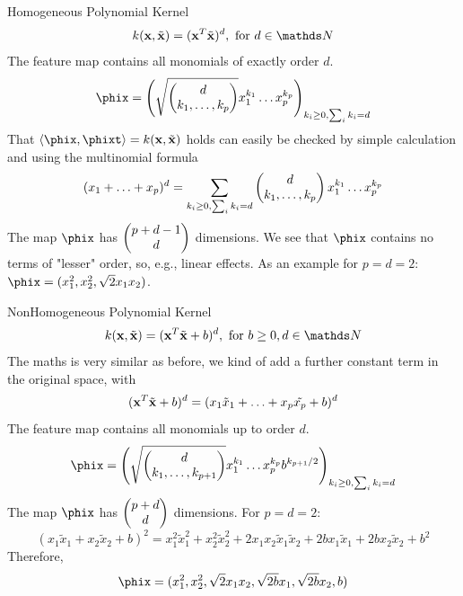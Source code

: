 \documentclass[11pt,compress,t,notes=noshow, xcolor=table]{beamer}
\begin{document}

\begin{vbframe}{Homogeneous Polynomial Kernel}
$$ k(\xv, \xtil) = (\xv^T \xtil)^d, \text{ for } d \in \N$$
The feature map contains all monomials of exactly order $d$.
  $$\phix = \left( \sqrt{\mat{d \\ k_1, \ldots, k_p}} x_1^{k_1} \ldots x_p^{k_p}\right)_{k_i \geq 0, \sum_i k_i = d}$$
That $\scp{\phix}{\phixt} = k(\xv, \xtil)$ holds can easily be checked by simple calculation
and using the multinomial formula
$$ (x_1 + \ldots + x_p)^d = \sum_{k_i \geq 0, \sum_i k_i = d} \begin{pmatrix} d \\ k_1, \ldots, k_p \end{pmatrix} x_1^{k_1} \ldots x_p^{k_p}$$
The map $\phix$ has $\begin{pmatrix} p + d - 1 \\ d \end{pmatrix}$ dimensions.
We see that $\phix$ contains no terms of "lesser" order, so, e.g., linear effects.
As an example for $p=d=2$: $\phix = (x_1^2, x_2^2, \sqrt{2} x_1 x_2)$.
\end{vbframe}

\begin{vbframe}{NonHomogeneous Polynomial Kernel}
\small
 $$k(\xv, \xtil) = (\xv^T \xtil + b)^d, \text{ for } b\geq 0, d \in \N$$
The maths is very similar as before, we kind of add a further constant term in the original space, with
$$ (\mathbf{x}^T \tilde{\mathbf{x}} + b)^d = (x_1 \tilde{x}_1 + \ldots + x_p \tilde{x_p} + b)^d$$
The feature map contains all monomials up to order $d$.
  $$\phix = \left( \sqrt{\mat{d \\ k_1, \ldots, k_{p+1}}} x_1^{k_1} \ldots x_p^{k_p} b^{k_{p+1}/2} \right)_{k_i \geq 0, \sum_i k_i = d}$$
The map $\phix$ has $\begin{pmatrix} p + d\\ d \end{pmatrix}$ dimensions. For $p=d=2$: 
$$(x_1 \tilde{x}_1 + x_2 \tilde{x}_2 + b)^2 = x_1^2\tilde{x}_1^2 + x_2^2 \tilde{x}_2^2 + 2 x_1 x_2 \tilde{x}_1 \tilde{x}_2 + 2b x_1 \tilde{x}_1 + 2b x_2 \tilde{x}_2 + b^2$$
Therefore, 
$$\phix = (x_1^2, x_2^2, \sqrt{2} x_1 x_2, \sqrt{2b} x_1, \sqrt{2b} x_2, b)$$
\end{vbframe}
\end{document}
